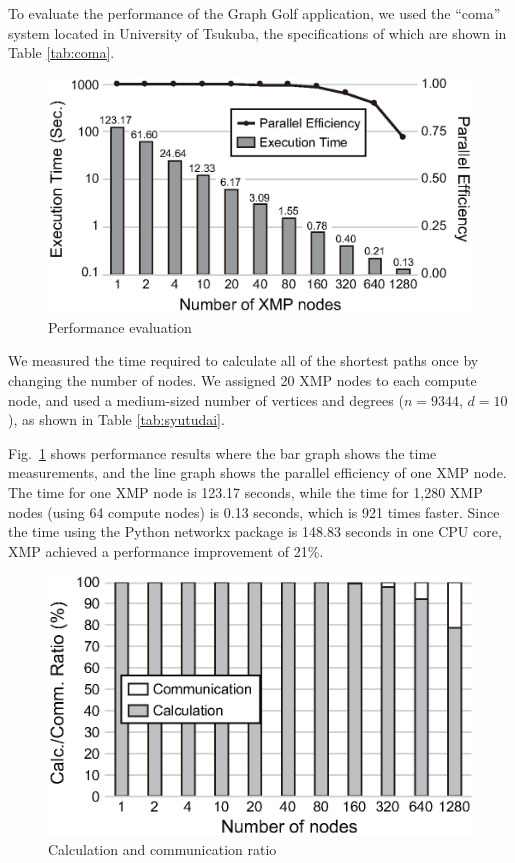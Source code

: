 \documentclass[graybox]{svmult}
\begin{document}
To evaluate the performance of the Graph Golf application, 
we used the ``coma'' system located in University of Tsukuba, the specifications of which are shown in Table \ref{tab:coma}. 

\begin{figure}[t]
\centering
\includegraphics[scale=0.55,clip]{img/result.eps}
\caption{Performance evaluation} \label{fig:result}
\end{figure}

We measured the time required to calculate all of the shortest paths once by changing the number of nodes.
We assigned 20 XMP nodes to each compute node, and used
a medium-sized number of vertices and degrees ($n = 9344$, $d = 10$), as shown in Table \ref{tab:syutudai}.

Fig.~\ref{fig:result} shows performance results where the bar graph shows the time measurements, 
and the line graph shows the parallel efficiency of one XMP node.
The time for one XMP node is 123.17 seconds, 
while the time for 1,280 XMP nodes (using 64 compute nodes) is 0.13 seconds, 
which is 921 times faster. 
Since the time using the Python networkx package is 148.83 seconds in one CPU core, 
XMP achieved a performance improvement of 21\%.

\begin{figure}[t]
\centering
\includegraphics[scale=0.55,clip]{img/comm.eps}
\caption{Calculation and communication ratio}\label{fig:comm}
\end{figure}
\end{document}
